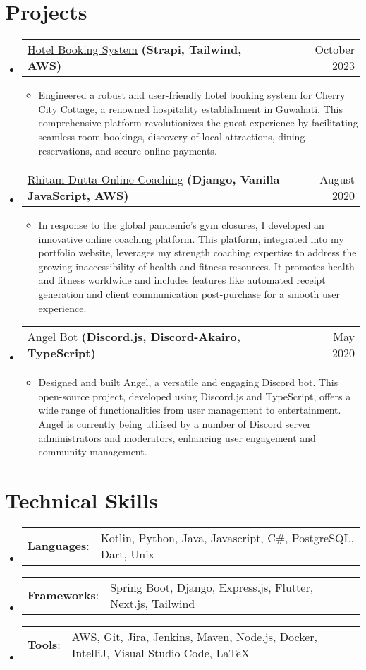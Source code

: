 \documentclass[letterpaper,11pt]{article}
\makeatletter
\newcommand{\sectionStart}{
  \begin{itemize}[label={},leftmargin=0in]
}
\newcommand{\sectionEnd}{
  \end{itemize}
}
\newcommand{\skillItem}[2]{
  \vspace{-1pt}
  \item
  \begin{tabular*}{1.0\textwidth}{l@{}l@{}}
    \footnotesize{\textbf{#1}: } & \footnotesize{#2}
  \end{tabular*}\vspace{-22pt}
}
\newcommand{\projectHeading}[4]{
  \vspace{-1pt}
  \item
  \begin{tabular*}{1.0\textwidth}{l@{\extracolsep{\fill}}r@{}}
    \small{{\href{#1}{#2}} \textbf{#3}} & \small{#4} \\
  \end{tabular*}\vspace{-5pt}
}
\newcommand{\listStart}{\begin{itemize}}
\newcommand{\listEnd}{\end{itemize}\vspace{-6pt}}
\newcommand{\bulletItem}[1]{
  \item
  \small{
    {#1 \vspace{-1.8pt}}
  }
}
\makeatother
\begin{document}
\section{Projects}
\sectionStart
\projectHeading
    {https://github.com/exthazor/CherryCityCottage-Frontend/}
    {Hotel Booking System}
    {(Strapi, Tailwind, AWS)}
    {October 2023}
  \listStart
    \bulletItem
      {Engineered a robust and user-friendly hotel booking system for Cherry City Cottage, a renowned hospitality establishment in Guwahati. This comprehensive platform revolutionizes the guest experience by facilitating seamless room bookings, discovery of local attractions, dining reservations, and secure online payments.}
  \listEnd
  \projectHeading
    {https://github.com/exthazor/rhitamdutta/}
    {Rhitam Dutta Online Coaching}
    {(Django, Vanilla JavaScript, AWS)}
    {August 2020}
  \listStart
    \bulletItem
      {In response to the global pandemic's gym closures, I developed an innovative online coaching platform. This platform, integrated into my portfolio website, leverages my strength coaching expertise to address the growing inaccessibility of health and fitness resources. It promotes health and fitness worldwide and includes features like automated receipt generation and client communication post-purchase for a smooth user experience.}
  \listEnd
  \projectHeading
    {https://github.com/exthazor/angel}
    {Angel Bot}
    {(Discord.js, Discord-Akairo, TypeScript)}
    {May 2020}
  \listStart
    \bulletItem
    {Designed and built Angel, a versatile and engaging Discord bot. This open-source project, developed using Discord.js and TypeScript, offers a wide range of functionalities from user management to entertainment. Angel is currently being utilised by a number of Discord server administrators and moderators, enhancing user engagement and community management.}
  \listEnd
\sectionEnd

\section{Technical Skills}
\sectionStart
  \skillItem
    {Languages}
    {Kotlin, Python, Java, Javascript, C\#, PostgreSQL, Dart, Unix}
  \skillItem
    {Frameworks}
    {Spring Boot, Django, Express.js, Flutter, Next.js, Tailwind}
  \skillItem
    {Tools}
    {AWS, Git, Jira, Jenkins, Maven, Node.js, Docker, IntelliJ, Visual Studio Code, \LaTeX\ }
  \vspace{3pt}
\sectionEnd
\end{document}
